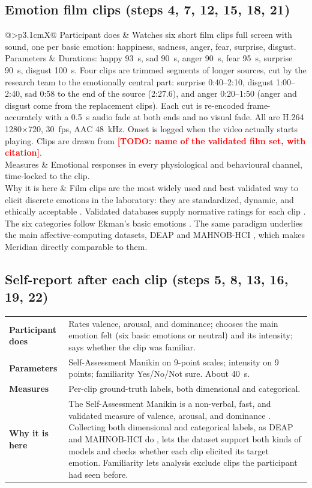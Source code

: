 \documentclass[11pt,a4paper]{article}
\makeatletter
\newcommand{\TODO}[1]{\textcolor{red}{\textbf{[TODO: #1]}}}
\newcommand{\taskdetail}[4]{%
  \begin{tabularx}{\linewidth}{@{}>{\bfseries}p{3.1cm}X@{}}
    Participant does & #1 \\
    Parameters & #2 \\
    Measures & #3 \\
    Why it is here & #4 \\
  \end{tabularx}}
\makeatother
\begin{document}
\subsection{Emotion film clips (steps 4, 7, 12, 15, 18, 21)}
\taskdetail
{Watches six short film clips full screen with sound, one per basic emotion: happiness, sadness, anger, fear,
surprise, disgust.}
{Durations: happy 93~s, sad 90~s, anger 90~s, fear 95~s, surprise 90~s, disgust 100~s. Four clips are trimmed
segments of longer sources, cut by the research team to the emotionally central part: surprise 0:40--2:10, disgust
1:00--2:40, sad 0:58 to the end of the source (2:27.6), and anger 0:20--1:50 (anger and disgust come from the
replacement clips). Each cut is re-encoded frame-accurately with a 0.5~s audio fade at both ends and no visual fade.
All are H.264 1280$\times$720, 30~fps, AAC 48~kHz. Onset is logged when the video actually
starts playing. Clips are drawn from \TODO{name of the validated film set, with citation}.}
{Emotional responses in every physiological and behavioural channel, time-locked to the clip.}
{Film clips are the most widely used and best validated way to elicit discrete emotions in the laboratory: they
are standardized, dynamic, and ethically acceptable \cite{gross1995,rottenberg2007}. Validated databases supply
normative ratings for each clip \cite{schaefer2010}. The six categories follow Ekman's basic emotions
\cite{ekman1992}. The same paradigm underlies the main affective-computing datasets, DEAP \cite{koelstra2012} and
MAHNOB-HCI \cite{soleymani2012}, which makes Meridian directly comparable to them.}

\subsection{Self-report after each clip (steps 5, 8, 13, 16, 19, 22)}
\taskdetail
{Rates valence, arousal, and dominance; chooses the main emotion felt (six basic emotions or neutral) and its
intensity; says whether the clip was familiar.}
{Self-Assessment Manikin on 9-point scales; intensity on 9 points; familiarity Yes/No/Not sure. About 40~s.}
{Per-clip ground-truth labels, both dimensional and categorical.}
{The Self-Assessment Manikin is a non-verbal, fast, and validated measure of valence, arousal, and dominance
\cite{bradley1994}. Collecting both dimensional and categorical labels, as DEAP and MAHNOB-HCI do
\cite{koelstra2012,soleymani2012}, lets the dataset support both kinds of models and checks whether each clip
elicited its target emotion. Familiarity lets analysis exclude clips the participant had seen before.}
\end{document}

